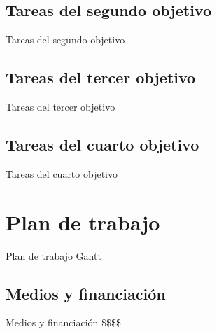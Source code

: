 \documentclass{beamer}
\begin{document}
\subsection{Tareas del segundo objetivo}

\begin{frame}{Tareas del segundo objetivo}

\end{frame}

\subsection{Tareas del tercer objetivo}

\begin{frame}{Tareas del tercer objetivo}

\end{frame}

\subsection{Tareas del cuarto objetivo}

\begin{frame}{Tareas del cuarto objetivo}

\end{frame}

\section{Plan de trabajo}

\begin{frame}{Plan de trabajo}
Gantt
\end{frame}

\subsection{Medios y financiación}

\begin{frame}{Medios y financiación}
\$\$\$\$
\end{frame}
\end{document}
